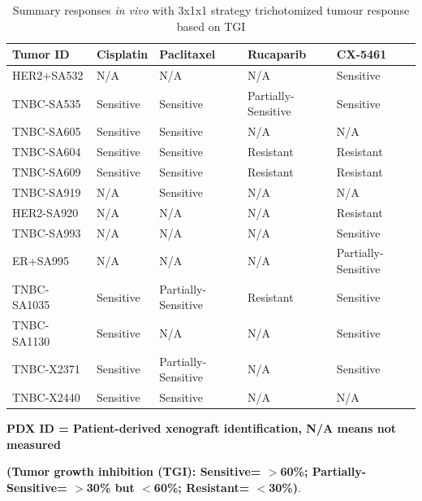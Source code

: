 \begin{table}[htbp]
  \centering
  \caption{Summary responses \textit{in vivo} with 3x1x1 strategy trichotomized tumour response based on TGI \cite{hather2014growth, aykan2020objective}}
    \begin{tabular}{|l|l|l|l|l|}
    
     \hline
    \textbf{Tumor ID} & \textbf{Cisplatin} & \textbf{Paclitaxel} & \textbf{Rucaparib} & \textbf{CX-5461} \\
     \hline
    HER2+SA532 & N/A   & N/A   & N/A   & Sensitive \\
    TNBC-SA535 & Sensitive & Sensitive & Partially-Sensitive & Sensitive \\
    TNBC-SA605 & Sensitive & Sensitive & N/A   & N/A \\
    TNBC-SA604 & Sensitive & Sensitive & Resistant & Resistant \\
    TNBC-SA609 & Sensitive & Sensitive & Resistant & Resistant \\
    TNBC-SA919 & N/A   & Sensitive & N/A   & N/A \\
    HER2-SA920 & N/A   & N/A   & N/A   & Resistant \\
    TNBC-SA993 & N/A   & N/A   & N/A   & Sensitive \\
    ER+SA995 & N/A   & N/A   & N/A   & Partially-Sensitive \\
    TNBC-SA1035 & Sensitive & Partially-Sensitive & Resistant & Sensitive \\
    TNBC-SA1130 & Sensitive & N/A   & N/A   & Sensitive \\
    TNBC-X2371 & Sensitive & Partially-Sensitive & N/A   & Sensitive \\
    TNBC-X2440 & Sensitive & Sensitive & N/A   & N/A \\
     \hline
    \end{tabular}%

\small\textbf{PDX ID = Patient-derived xenograft identification, N/A means not measured}\\
  \label{tab:PDXtumorsinvivo}%


   \small\textbf{ (Tumor growth inhibition (TGI): Sensitive= $>$60\%; Partially-Sensitive= $>$30\% but $<$60\%; Resistant= $<$30\%)}.
\end{table}%





